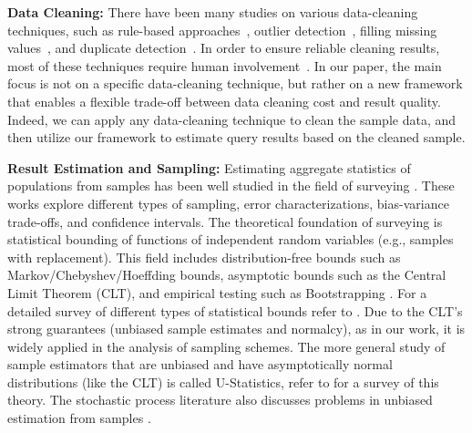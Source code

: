 {\noindent \bf Data Cleaning:} There have been many studies on various data-cleaning techniques, such as rule-based approaches~\cite{fan2012foundations,DBLP:conf/sigmod/DallachiesaEEEIOT13}, outlier detection~\cite{hellerstein2008quantitative,dasu2003exploratory}, filling missing values~\cite{conf/icde/BethTMP13, parkcrowdfill}, and duplicate detection~\cite{conf/hdkm/Christen08, DBLP:conf/kdd/BilenkoM03, conf/sigmod/WangLF12}. In order to ensure reliable cleaning results, most of these techniques require human involvement~\cite{DBLP:conf/sigmod/JefferyFH08,DBLP:journals/pvldb/FanLMTY10,DBLP:journals/pvldb/YakoutENOI11,DBLP:journals/pvldb/WangKFF12,DBLP:conf/sigmod/WangLKFF13}. 
In our paper, the main focus is not on a specific data-cleaning technique, but rather on a new framework that enables a flexible trade-off between data cleaning cost and result quality.
Indeed, we can apply any data-cleaning technique to clean the sample data, and then utilize our framework to estimate query results based on the cleaned sample. 


\vspace{.5em}

{\noindent \bf Result Estimation and Sampling:}
Estimating aggregate statistics of populations from samples has been well studied in the field of surveying \cite{weisberg2009total,valliant2000finite, hansen1987some, barnett1991sample, sarndal2003model, kalton1983introduction}.
These works explore different types of sampling, error characterizations, bias-variance trade-offs, and confidence intervals.
The theoretical foundation of surveying is statistical bounding of functions of independent random variables (e.g., samples with replacement).
This field includes distribution-free bounds such as Markov/Chebyshev/Hoeffding bounds, asymptotic bounds such as the Central Limit Theorem (CLT), and empirical testing such as Bootstrapping \cite{hinkley1988bootstrap}.
For a detailed survey of different types of statistical bounds refer to \cite{hahn2011statistical}.
Due to the CLT's strong guarantees (unbiased sample estimates and normalcy), as in our work, it is widely applied in the analysis of sampling schemes.
The more general study of sample estimators that are unbiased and have asymptotically normal distributions (like the CLT) is called U-Statistics, refer to \cite{lee1990u} for a survey of this theory.
The stochastic process literature also discusses problems in unbiased estimation from samples \cite{jacod1987limit}.

